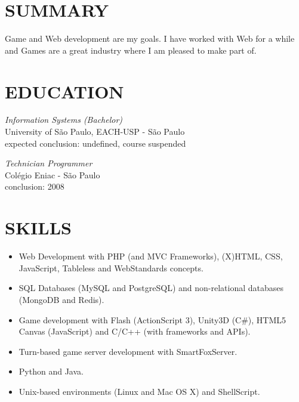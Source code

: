 \documentclass[line,margin]{res}
\begin{document}

\address{Rua A, 46, Cond. Grand Prix, C1-203 - Manaus, AM - Brazil}
\address{+55 11 999326440 - bruno@croci.me - \href{http://bruno.croci.me/}{http://bruno.croci.me/}}

 
\begin{resume}
 
\section{SUMMARY} Game and Web development are my goals. I have worked with Web for a while and Games are a great industry where I am pleased to make part of.
 
 
\section{EDUCATION} {\sl Information Systems (Bachelor)} \\
                University of São Paulo, EACH-USP - São Paulo \\
                expected conclusion: undefined, course suspended
		
		{\sl Technician Programmer} \\
                Colégio Eniac - São Paulo \\
                conclusion: 2008
                
 
\section{SKILLS} \begin{itemize}  \itemsep 1pt
                 \item Web Development with PHP (and MVC Frameworks), (X)HTML, CSS, JavaScript, 
                       Tableless and WebStandards concepts.
                 \item SQL Databases (MySQL and PostgreSQL) and non-relational databases (MongoDB and Redis).
                 \item Game development with Flash (ActionScript 3), Unity3D (C\#),
                       HTML5 Canvas (JavaScript) and C/C++ (with frameworks and APIs).
                 \item Turn-based game server development with SmartFoxServer.
                 \item Python and Java.
                 \item Unix-based environments (Linux and Mac OS X) and ShellScript.
                 \end{itemize}
 

\end{resume}
\end{document}
